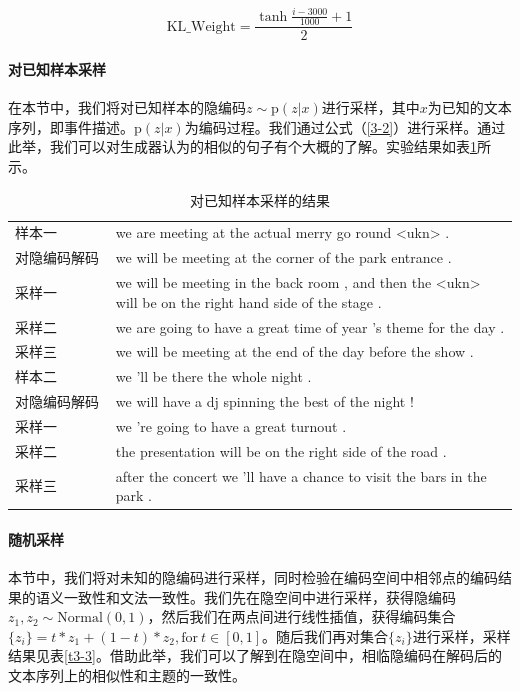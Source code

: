 \documentclass[]{template}
\begin{document}
\begin{equation}\label{3-8}
    \mathrm{KL\_Weight}=\frac{\tanh\frac{i-3000}{1000}+1}{2}
\end{equation}

\paragraph{对已知样本采样}  
在本节中，我们将对已知样本的隐编码$z \sim \mathrm{p}(z|x)$进行采样，其中$x$为已知的文本序列，即事件描述。$\mathrm{p}(z|x)$为编码过程。我们通过公式（\ref{3-2}）进行采样。通过此举，我们可以对生成器认为的相似的句子有个大概的了解。实验结果如表\ref{t3-2}所示。 
\begin{table}[htb]
    \center
    \caption{\label{t3-2}对已知样本采样的结果}
    \begin{tabular*}{\linewidth}{p{0.2\linewidth}p{0.8\linewidth}}
\toprule
样本一 & we are meeting at the actual merry go round <ukn> . \\
对隐编码解码 & we will be meeting at the corner of the park entrance .\\ 
采样一 & we will be meeting in the back room , and then the <ukn> will be on the right hand side of the stage .\\
采样二 & we are going to have a great time of year 's theme for the day . \\
采样三 & we will be meeting at the end of the day before the show . \\
\midrule
样本二 & we 'll be there the whole night . \\
对隐编码解码 & we will have a dj spinning the best of the night !\\ 
采样一 & we 're going to have a great turnout .\\
采样二 & the presentation will be on the right side of the road .\\
采样三 & after the concert we 'll have a chance to visit the bars in the park . \\
\bottomrule
    \end{tabular*}
\end{table}
\paragraph{随机采样}
本节中，我们将对未知的隐编码进行采样，同时检验在编码空间中相邻点的编码结果的语义一致性和文法一致性。我们先在隐空间中进行采样，获得隐编码$z_1,z_2 \sim \mathrm{Normal}(0,1)$，然后我们在两点间进行线性插值，获得编码集合$\{z_i\} = t*z_1+(1-t)*z_2 ,\mathrm{for}\ t \in [0,1]$。随后我们再对集合$\{z_i\}$进行采样，采样结果见表\ref{t3-3}。借助此举，我们可以了解到在隐空间中，相临隐编码在解码后的文本序列上的相似性和主题的一致性。 
\end{document}
